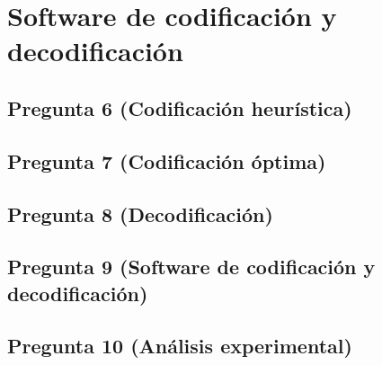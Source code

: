 \section{Software de codificación y decodificación}

\subsection{Pregunta 6 (Codificación heurística)}
\subsection{Pregunta 7 (Codificación óptima)}
\subsection{Pregunta 8 (Decodificación)}
\subsection{Pregunta 9 (Software de codificación y decodificación)}

\subsection{Pregunta 10 (Análisis experimental)}
